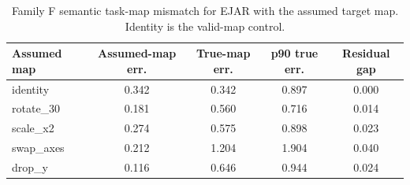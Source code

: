 \begin{table}[t]
\centering
\small
\caption{Family F semantic task-map mismatch for EJAR with the assumed target map. Identity is the valid-map control.}
\label{tab:task-mismatch}
\begin{tabular}{lcccc}
\toprule
Assumed map & Assumed-map err. & True-map err. & p90 true err. & Residual gap \\
\midrule
identity & 0.342 & 0.342 & 0.897 & 0.000 \\
rotate\_30 & 0.181 & 0.560 & 0.716 & 0.014 \\
scale\_x2 & 0.274 & 0.575 & 0.898 & 0.023 \\
swap\_axes & 0.212 & 1.204 & 1.904 & 0.040 \\
drop\_y & 0.116 & 0.646 & 0.944 & 0.024 \\
\bottomrule
\end{tabular}
\end{table}
